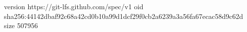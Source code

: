 version https://git-lfs.github.com/spec/v1
oid sha256:44142dbaf92c68a42cd0b10a99d1dcf29f0cb2a6239a3a56fa67ecac58d9c62d
size 507956
